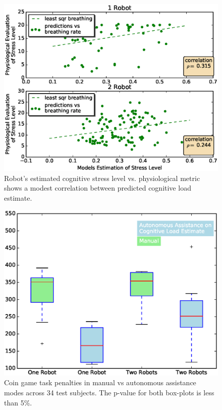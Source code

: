 \documentclass{sig-alternate}
\begin{document}
\begin{figure}  
\centering
\includegraphics[width=.5\textwidth]{prediction_vs_b_p_2.eps}
\caption{ Robot's estimated cognitive stress level vs. physiological metric shows a modest correlation between predicted
cognitive load estimate. }
\label{fig:pred_phy}
\end{figure}

\begin{figure}
\centering
\includegraphics[width=.5\textwidth]{BoxWiskerTimesCompMaualVsAuto2.eps}
\caption{Coin game task penalties in manual vs autonomous assistance modes across 34 test subjects. The p-value for both box-plots is less than 5\%.}
\label{fig:BoxWiskersTimeComp}
\end{figure}

\end{document}
